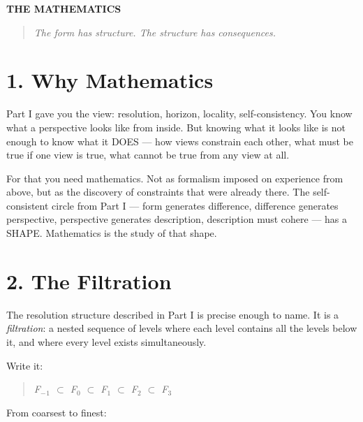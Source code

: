 \vspace{1cm}
\begin{center}
{\Large\sffamily\bfseries\color{headerblue} THE MATHEMATICS}
\end{center}
\vspace{0.5cm}


\begin{quote}
\itshape
\textit{The form has structure. The structure has consequences.}
\end{quote}


\bigskip\noindent\makebox[\textwidth]{\color{rulegray}\rule{5cm}{0.3pt}}\bigskip


\section*{1. Why Mathematics}


Part I gave you the view: resolution, horizon, locality, self-consistency. You know what a perspective looks like from inside. But knowing what it looks like is not enough to know what it DOES — how views constrain each other, what must be true if one view is true, what cannot be true from any view at all.


For that you need mathematics. Not as formalism imposed on experience from above, but as the discovery of constraints that were already there. The self-consistent circle from Part I — form generates difference, difference generates perspective, perspective generates description, description must cohere — has a SHAPE. Mathematics is the study of that shape.


\section*{2. The Filtration}


The resolution structure described in Part I is precise enough to name. It is a \textit{filtration}: a nested sequence of levels where each level contains all the levels below it, and where every level exists simultaneously.


Write it:


\begin{quote}
\itshape
F$_{-}$$_1$ $\subset$ F$_0$ $\subset$ F$_1$ $\subset$ F$_2$ $\subset$ F$_3$
\end{quote}


From coarsest to finest:


